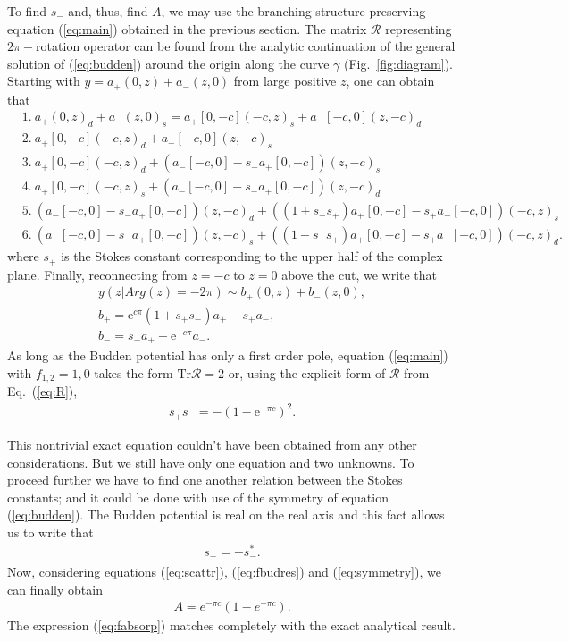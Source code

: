 \documentclass{ws-m3as}
\def\rme{\mathrm{e}}
\def\R{\bm{\mathcal{R}}}
\def\Tr{\mathrm{Tr}}
\newcommand\eref[1]{(\ref{#1})}
\newcommand\fref[1]{Fig.~\ref{#1}}
\begin{document}
To find $s_-$ and, thus, find $A$, we may use the branching structure preserving 
equation \eref{eq:main} obtained in the previous section. The matrix $\R$ representing $2\pi-$rotation operator
can be found from the analytic continuation of the general solution of \eref{eq:budden}
around the origin along the curve $\gamma$ (\fref{fig:diagram}). 
Starting with $y=a_+(0,z) + a_-(z,0)$ from large positive $z$, 
one can obtain that
\begin{equation}
\begin{split}
&1.\ a_+(0,z)_d+a_-(z,0)_s=a_+[0,-c](-c,z)_s + a_-[-c,0](z,-c)_d
\\
&2.\ a_+[0,-c](-c,z)_d + a_-[-c,0](z,-c)_s 
\\
&3.\ a_+[0,-c](-c,z)_d + (a_-[-c,0] - s_- a_+[0,-c])(z,-c)_s 
\\
&4.\ a_+[0,-c](-c,z)_s + (a_-[-c,0] - s_- a_+[0,-c])(z,-c)_d 
\\
&5.\ (a_-[-c,0] - s_- a_+[0,-c])(z,-c)_d + ((1 + s_-s_+)a_+[0,-c] - s_+ a_-[-c,0])(-c,z)_s
\\
&6.\ (a_-[-c,0] - s_- a_+[0,-c])(z,-c)_s + ((1 + s_-s_+)a_+[0,-c] - s_+ a_-[-c,0])(-c,z)_d.
\end{split}
\end{equation}
where $s_+$ is the Stokes constant corresponding to the upper half of the complex plane.
Finally, reconnecting from $z=-c$ to $z=0$ above the cut, we write that
\begin{equation}
\begin{split}
y(z | Arg(z) = -2\pi) \sim b_+(0,z) + b_-(z,0),
\\
b_+ = \rme^{c \pi} (1 + s_+s_-)a_+ - s_+a_-,
\\
b_- = s_- a_+ + \rme^{-c \pi} a_-.
\label{eq:R} 
\end{split}
\end{equation}
As long as the Budden potential has only a first order pole, equation \eref{eq:main}
with $f_{1,2}=1,0$ takes the form $\Tr\R=2$ or, using the explicit form of $\R$ from Eq.~\eref{eq:R},
\begin{eqnarray}
s_+s_- = - (1-\rme^{- \pi c})^2.
\label{eq:fbudres}
\end{eqnarray}

This nontrivial exact equation couldn't have been obtained from any other considerations. But we
still have only one equation and two unknowns. To proceed further we have to find one another
relation between the Stokes constants; and it could be done with use of the symmetry 
of equation \eref{eq:budden}. The Budden potential is real on the real axis and
this fact allows us to write\cite{aksymm,frsymm} that
\begin{eqnarray}
s_+ = -s_-^*.
\label{eq:symmetry}
\end{eqnarray}
Now, considering equations \eref{eq:scattr}, \eref{eq:fbudres} and \eref{eq:symmetry}, we can
finally obtain 
\begin{eqnarray}
A = e^{-\pi c}(1-e^{-\pi c}).
\label{eq:fabsorp}
\end{eqnarray}
The expression \eref{eq:fabsorp} matches completely with the exact analytical result\cite{rwbook}.
\end{document}
